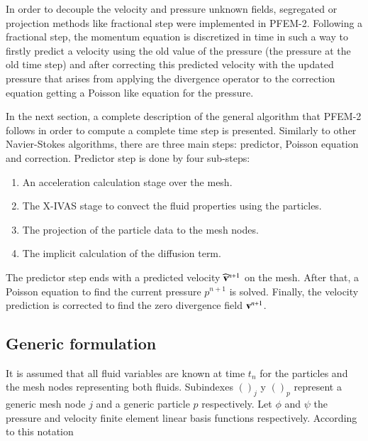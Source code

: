In order to decouple the velocity and pressure unknown fields, segregated or projection methods like fractional step were implemented in PFEM-2. Following a fractional step, the momentum equation is discretized in time in such a way to firstly predict a velocity using the old value of the pressure (the pressure at the old time step) and after correcting this predicted velocity with the updated pressure that arises from applying the divergence operator to the correction equation getting a Poisson like equation for the pressure.

In the next section, a complete description of the general algorithm that PFEM-2 follows in order to compute a complete time step is presented. Similarly to other Navier-Stokes algorithms, there are three main steps: predictor, Poisson equation and correction. Predictor step is done by four sub-steps: 

\begin{enumerate}
  \item An acceleration calculation stage over the mesh.
  \item The X-IVAS stage to convect the fluid properties using the particles.
  \item The projection of the particle data to the mesh nodes.
  \item The implicit calculation of the diffusion term.
\end{enumerate}

The predictor step ends with a predicted velocity $\widehat{\mathbf{v}}^{n+1}$ on the mesh. After that, a Poisson equation to find the current pressure $p^{n+1}$ is solved. Finally, the velocity prediction is corrected to find the zero divergence field $\mathbf{v}^{n+1}$.

\subsection{Generic formulation}\label{GeneralFor}

It is assumed that all fluid variables are known at time $t_n$ for the particles and the mesh nodes representing both fluids. Subindexes $()_j$ y $()_p$ represent a generic mesh node $j$ and a generic particle $p$ respectively. Let $\phi$ and $\psi$ the pressure and velocity finite element linear basis functions respectively. According to this notation

